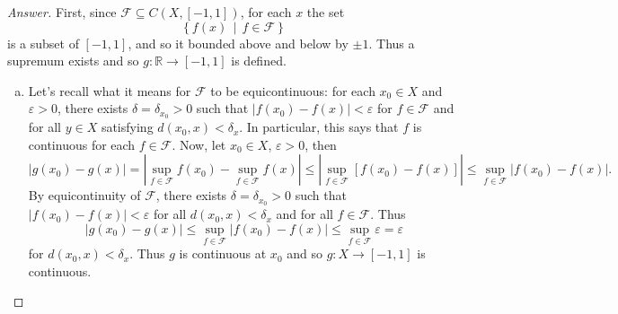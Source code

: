 \documentclass[12pt]{article}
\newcommand{\real}{\mathbb{R}}
\newcommand\paren[1]{\left( #1 \right)}
\newcommand\setb[1]{\left \{ #1 \right \}}
\newcommand{\sqbrack}[1]{\left [ #1 \right ]}
\newcommand{\abs}[1]{\left | #1 \right |}
\newcommand{\eps}{\varepsilon}
\theoremstyle{definition}
\begin{document}
\begin{proof}[Answer]
    First, since $\mathcal{F} \subseteq C(X,[-1,1])$, for each $x$ the set 
    \[
        \setb{ f(x) \, \middle| \, f \in \mathcal{F} }
    \]
    is a subset of $[-1,1]$, and so it bounded above and below by $\pm 1$. Thus a supremum exists and so $g : \real \to [-1,1]$ is defined. 
    \begin{enumerate}[(a)]
        \item Let's recall what it means for $\mathcal{F}$ to be equicontinuous: for each $x_0 \in X$ and $\eps > 0$, there exists $\delta = \delta_{x_0} > 0$ such that $\abs{f \paren{x_0} - f(x) } < \eps$ for $f \in \mathcal{F}$ and for all $y \in X$ satisfying $d \paren{ x_0 , x } < \delta_x$. In particular, this says that $f$ is continuous for each $f \in \mathcal{F}$. Now, let $x_0 \in X$, $\eps > 0$,  then 
        \[
            \abs{ g \paren{ x_0 } - g(x) } = \abs{ \sup\limits_{f \in \mathcal{F}} f \paren{ x_0 } - \sup\limits_{f \in \mathcal{F}} f \paren{ x } } \leq \abs{ \sup\limits_{f \in \mathcal{F}} \sqbrack{ f \paren{ x_0 } - f(x) } } \leq \sup\limits_{f \in \mathcal{F}} \abs{ f \paren{ x_0 } - f(x) } . 
        \]
        By equicontinuity of $\mathcal{F}$, there exists $\delta = \delta_{x_0} > 0$ such that $\abs{ f \paren{ x_0 } - f(x) }  < \eps$ for all $d \paren{ x_0 , x } < \delta_x$ and for all $f \in \mathcal{F}$. Thus 
        \[
            \abs{ g \paren{ x_0 } - g(x) } \leq \sup\limits_{f \in \mathcal{F}} \abs{ f \paren{ x_0 } - f(x) } \leq  \sup\limits_{f \in \mathcal{F}} \eps = \eps 
        \]
        for $d \paren{ x_0 , x } < \delta_x$. Thus $g$ is continuous at $x_0$ and so $g : X \to [-1,1]$ is continuous. 
        

\end{enumerate}
\end{proof}
\end{document}
